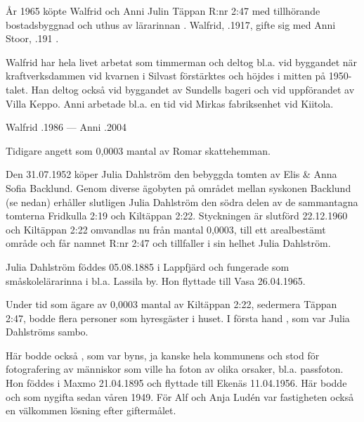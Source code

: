 %

%
År 1965 köpte Walfrid och Anni Julin Täppan R:nr 2:47 med tillhörande bostadsbyggnad och uthus av lärarinnan . Walfrid, .1917, gifte sig med Anni Stoor, .191 .

Walfrid har hela livet arbetat som timmerman och deltog bl.a. vid byggandet när kraftverksdammen vid kvarnen i Silvast förstärktes och höjdes i mitten på 1950-talet. Han deltog också vid byggandet av Sundells bageri och vid uppförandet av Villa Keppo. Anni arbetade bl.a. en tid vid Mirkas fabriksenhet vid Kiitola.

Walfrid .1986  ---  Anni .2004


%

Tidigare angett som 0,0003 mantal av Romar skattehemman.


%
Den 31.07.1952 köper Julia Dahlström den bebyggda tomten av Elis \& Anna Sofia Backlund. Genom diverse ägobyten på området mellan syskonen Backlund (se nedan) erhåller slutligen Julia Dahlström den södra delen av de sammantagna tomterna Fridkulla 2:19 och Kiltäppan 2:22. Styckningen är slutförd 22.12.1960 och Kiltäppan 2:22 omvandlas nu från mantal 0,0003, till ett arealbestämt område och får namnet  R:nr 2:47 och tillfaller i sin helhet Julia Dahlström.

Julia Dahlström föddes 05.08.1885 i Lappfjärd och fungerade som småskolelärarinna i bl.a. Lassila by. Hon flyttade till Vasa 26.04.1965.


Under  tid som ägare av 0,0003 mantal av Kiltäppan 2:22, sedermera Täppan 2:47, bodde flera personer som hyresgäster i huset. I första hand , som var Julia Dahlströms sambo.

Här bodde också , som var byns, ja kanske hela kommunens  och stod för fotografering av människor som ville ha foton av olika orsaker, bl.a. passfoton. Hon föddes i Maxmo 21.04.1895 och flyttade till Ekenäs 11.04.1956. Här bodde  och  som nygifta sedan våren 1949. För Alf och Anja Ludén var fastigheten också en välkommen lösning efter giftermålet.


